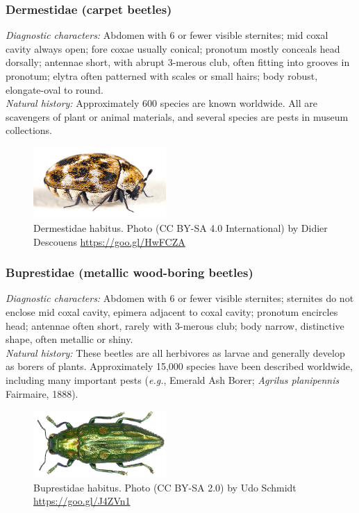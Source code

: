 \documentclass[letterpaper, 11pt]{article}
\begin{document}
\subsubsection{Dermestidae (carpet beetles)}
\noindent{}\textit{Diagnostic characters:} Abdomen with 6 or fewer visible sternites; mid coxal cavity always open; fore coxae usually conical; pronotum mostly conceals head dorsally; antennae short, with abrupt 3-merous club, often fitting into grooves in pronotum; elytra often patterned with scales or small hairs; body robust, elongate-oval to round.\\

\noindent{}\textit{Natural history:} Approximately 600 species are known worldwide. All are scavengers of plant or animal materials, and several species are pests in museum collections. \frownie{}

\begin{figure}[ht!]
  \centering
    \includegraphics[width=0.45\textwidth]{DermestidHabitus}
  \caption{Dermestidae habitus. Photo (CC BY-SA 4.0 International) by Didier Descouens \url{https://goo.gl/HwFCZA}}
  \label{fig:dermestid}
\end{figure}

\subsubsection{Buprestidae (metallic wood-boring beetles)}
\noindent{}\textit{Diagnostic characters:} Abdomen with 6 or fewer visible sternites; sternites do not enclose mid coxal cavity, epimera adjacent to coxal cavity; pronotum encircles head; antennae often short, rarely with 3-merous club; body narrow, distinctive shape, often metallic or shiny.\\

\noindent{}\textit{Natural history:} These beetles are all herbivores as larvae and generally develop as borers of plants. Approximately 15,000 species have been described worldwide, including many important pests (\textit{e.g.}, Emerald Ash Borer; \textit{Agrilus planipennis} Fairmaire, 1888).

\begin{figure}[ht!]
  \centering
    \includegraphics[width=0.45\textwidth]{BuprestidHabitus}
  \caption{Buprestidae habitus. Photo (CC BY-SA 2.0) by Udo Schmidt \url{https://goo.gl/J4ZVn1}}
  \label{fig:buprestid}
\end{figure}
\end{document}
